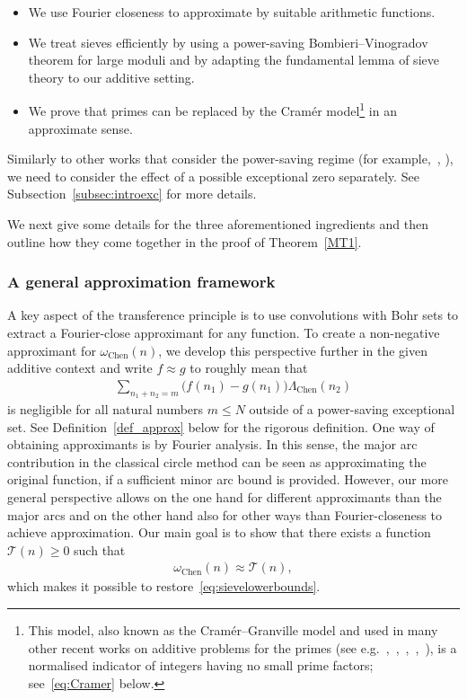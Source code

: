 \documentclass[12pt]{amsart}
\theoremstyle{definition}
\theoremstyle{remark}
\numberwithin{equation}{section}
\newcommand{\1}{\mathbf{1}}
\begin{document}
\begin{itemize}
    \item We use Fourier closeness to approximate by suitable arithmetic functions.
     \item We treat sieves efficiently by using a power-saving Bombieri--Vinogradov theorem for large moduli and by adapting the fundamental lemma of sieve theory to our additive setting.
    \item We prove that primes can be replaced by the Cram\'er model\footnote{This model, also known as the Cram\'er--Granville model and used in many other recent works on additive problems for the primes (see e.g.~\cite{tt-jems},~\cite{green-sarkozy},~\cite{MSTT},~\cite{MRSTT},~\cite{leng}), is a normalised indicator of integers having no small prime factors; see~\eqref{eq:Cramer} below.} in an approximate sense. 
\end{itemize}

Similarly to other works that consider the power-saving regime (for example,~\cite{mv}, \cite{green-roth}), we need to consider the effect of a possible exceptional zero separately. See Subsection~\ref{subsec:introexc} for more details.

We next give some details for the three aforementioned ingredients and then outline how they come together in the proof of Theorem~\ref{MT1}.

\subsubsection{A general approximation framework}

A key aspect of the transference principle is to use convolutions with Bohr sets to extract a Fourier-close approximant for any function. To create a non-negative approximant for $\omega_{\text{Chen}}(n)$, we develop this perspective further in the given additive context and write $f\approx g$ to roughly mean that
\begin{align*}
    \sum_{n_1+n_2=m}\bigl(f(n_1)-g(n_1)\bigr)\Lambda_{\text{Chen}}(n_2)
\end{align*}
is negligible for all natural numbers $m\leq N$ outside of a power-saving exceptional set. See Definition~\ref{def_approx} below for the rigorous definition. One way of obtaining approximants is by Fourier analysis. In this sense, the major arc contribution in the classical circle method can be seen as approximating the original function, if a sufficient minor arc bound is provided. However, our more general perspective allows on the one hand for different approximants than the major arcs and on the other hand also for other ways than Fourier-closeness to achieve approximation. Our main goal is to show that there exists a function $\mathcal{T}(n)\geq 0$ such that 
\begin{align}\label{eq:Chen_non-negativ}
    \omega_{\text{Chen}}(n) \approx \mathcal{T}(n),
\end{align}
which makes it possible to restore~\eqref{eq:sievelowerbounds}.
\end{document}
